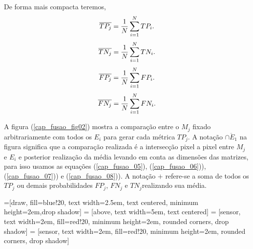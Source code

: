 
De forma mais compacta teremos,
\begin{equation}\label{cap_fusao_13}
\overline{TP_j}=\frac{1}{N}\sum_{i=1}^{N} TP_i. \\
\end{equation}
\begin{equation}\label{cap_fusao_14}
\overline{TN_j}=\frac{1}{N}\sum_{i=1}^{N} TN_i. \\
\end{equation}
\begin{equation}\label{cap_fusao_15}
\overline{FP_j}=\frac{1}{N}\sum_{i=1}^{N} FP_i. \\
\end{equation}
\begin{equation}\label{cap_fusao_16}
\overline{FN_j}=\frac{1}{N}\sum_{i=1}^{N} FN_i. \\
\end{equation}

A figura (\ref{cap_fusao_fig02}) mostra a comparação entre o $M_j$ fixado arbitrariamente com todos os $E_i$ para gerar cada métrica $TP_j$. A notação $\overline{\cap E_1}$ na figura significa que a comparação realizada é a intersecção pixel a pixel entre $M_j$ e $E_i$ e posterior realização da média levando em conta as dimensões das matrizes, para isso usamos as equações (\ref{cap_fusao_05}), (\ref{cap_fusao_06})), (\ref{cap_fusao_07})) e (\ref{cap_fusao_08})). A notação $+$ refere-se a soma de todos os $TP_j$ ou demais probabilidades $FP_j$, $FN_j$ e $TN_j$realizando sua média.

=[draw, fill=blue!20, text width=2.5em, 
    text centered, minimum height=2em,drop shadow]
 = [above, text width=5em, text centered]
 = [sensor, text width=2em, fill=red!20, 
    minimum height=2em, rounded corners, drop shadow]
 = [sensor, text width=2em, fill=red!20, 
    minimum height=2em, rounded corners, drop shadow]

